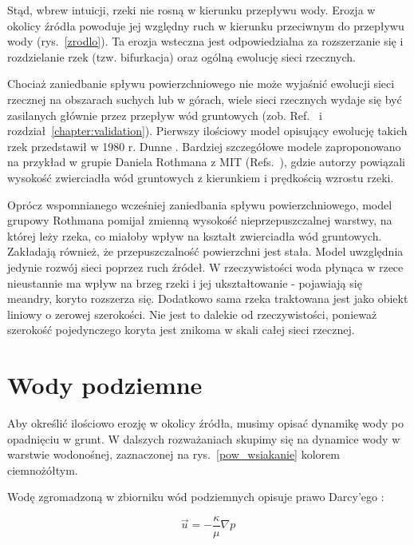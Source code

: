 \documentclass[]{pracamgr}
\begin{document}
    Stąd, wbrew intuicji, rzeki nie rosną w kierunku przepływu wody. Erozja w okolicy źródła powoduje jej względny ruch w kierunku przeciwnym do przepływu wody (rys.~\ref{zrodlo}). Ta erozja wsteczna jest odpowiedzialna za rozszerzanie się i rozdzielanie rzek (tzw. bifurkacja) oraz ogólną ewolucję sieci rzecznych.

    Chociaż zaniedbanie spływu powierzchniowego nie może wyjaśnić ewolucji sieci rzecznej na obszarach suchych lub w górach, wiele sieci rzecznych wydaje się być zasilanych głównie przez przepływ wód gruntowych (zob. Ref.~\cite{schumm1995ground, petroff2011geometry, seybold2017climate} i rozdział~\ref{chapter:validation}). Pierwszy ilościowy model opisujący ewolucję takich rzek przedstawił w 1980 r. Dunne \cite{dunne1980formation}. Bardziej szczegółowe modele zaproponowano na przykład w grupie Daniela Rothmana z MIT (Refs.~\cite{petroff2012four, devauchelle2012ramification}), gdzie autorzy powiązali wysokość zwierciadła wód gruntowych z kierunkiem i prędkością wzrostu rzeki.

    Oprócz wspomnianego wcześniej zaniedbania spływu powierzchniowego, model grupowy Rothmana pomijał zmienną wysokość nieprzepuszczalnej warstwy, na której leży rzeka, co miałoby wpływ na kształt zwierciadła wód gruntowych. Zakładają również, że przepuszczalność powierzchni jest stała. Model uwzględnia jedynie rozwój sieci poprzez ruch źródeł. W rzeczywistości woda płynąca w rzece nieustannie ma wpływ na brzeg rzeki i jej ukształtowanie - pojawiają się meandry, koryto rozszerza się. Dodatkowo sama rzeka traktowana jest jako obiekt liniowy o zerowej szerokości. Nie jest to dalekie od rzeczywistości, ponieważ szerokość pojedynczego koryta jest znikoma w skali całej sieci rzecznej.

    \section{Wody podziemne}

      Aby określić ilościowo erozję w okolicy źródła, musimy opisać dynamikę wody po opadnięciu w grunt. W dalszych rozważaniach skupimy się na dynamice wody w warstwie wodonośnej, zaznaczonej na rys.~\ref{pow_wsiakanie} kolorem ciemnożółtym.

      Wodę zgromadzoną w zbiorniku wód podziemnych opisuje prawo Darcy'ego \cite{darcy1856fontaines}:
      
      \begin{equation}
        \vec{u}=-\frac{\kappa}{\mu} \nabla p
      \end{equation}	
      
\end{document}
